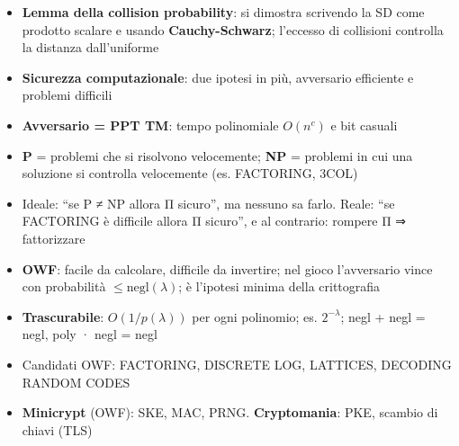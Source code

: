 \begin{itemize}
\tightlist
\item
  \textbf{Lemma della collision probability}: si dimostra scrivendo la SD come prodotto scalare e usando \textbf{Cauchy-Schwarz}; l'eccesso di collisioni controlla la distanza dall'uniforme
\item
  \textbf{Sicurezza computazionale}: due ipotesi in più, avversario efficiente e problemi difficili
\item
  \textbf{Avversario = PPT TM}: tempo polinomiale \(O(n^c)\) e bit casuali
\item
  \textbf{P} = problemi che si risolvono velocemente; \textbf{NP} = problemi in cui una soluzione si controlla velocemente (es. FACTORING, 3COL)
\item
  Ideale: ``se P ≠ NP allora Π sicuro'', ma nessuno sa farlo. Reale: ``se FACTORING è difficile allora Π sicuro'', e al contrario: rompere Π ⇒ fattorizzare
\item
  \textbf{OWF}: facile da calcolare, difficile da invertire; nel gioco l'avversario vince con probabilità \(\le \text{negl}(\lambda)\); è l'ipotesi minima della crittografia
\item
  \textbf{Trascurabile}: \(O(1/p(\lambda))\) per ogni polinomio; es. \(2^{-\lambda}\); negl + negl = negl, poly · negl = negl
\item
  Candidati OWF: FACTORING, DISCRETE LOG, LATTICES, DECODING RANDOM CODES
\item
  \textbf{Minicrypt} (OWF): SKE, MAC, PRNG. \textbf{Cryptomania}: PKE, scambio di chiavi (TLS)
\end{itemize}
